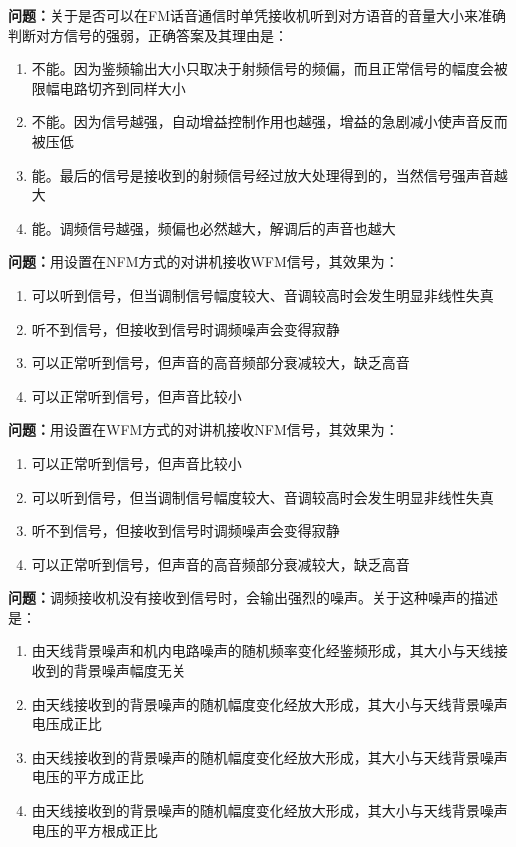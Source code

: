 \documentclass{ctexbook}%
\begin{document}
\textbf{问题：}关于是否可以在FM话音通信时单凭接收机听到对方语音的音量大小来准确判断对方信号的强弱，正确答案及其理由是：
\begin{enumerate}[label=\Alph*), leftmargin=3em]
\item 不能。因为鉴频输出大小只取决于射频信号的频偏，而且正常信号的幅度会被限幅电路切齐到同样大小
\item 不能。因为信号越强，自动增益控制作用也越强，增益的急剧减小使声音反而被压低
\item 能。最后的信号是接收到的射频信号经过放大处理得到的，当然信号强声音越大
\item 能。调频信号越强，频偏也必然越大，解调后的声音也越大
\end{enumerate}

\textbf{问题：}用设置在NFM方式的对讲机接收WFM信号，其效果为：
\begin{enumerate}[label=\Alph*), leftmargin=3em]
\item 可以听到信号，但当调制信号幅度较大、音调较高时会发生明显非线性失真
\item 听不到信号，但接收到信号时调频噪声会变得寂静
\item 可以正常听到信号，但声音的高音频部分衰减较大，缺乏高音
\item 可以正常听到信号，但声音比较小
\end{enumerate}

\textbf{问题：}用设置在WFM方式的对讲机接收NFM信号，其效果为：
\begin{enumerate}[label=\Alph*), leftmargin=3em]
\item 可以正常听到信号，但声音比较小
\item 可以听到信号，但当调制信号幅度较大、音调较高时会发生明显非线性失真
\item 听不到信号，但接收到信号时调频噪声会变得寂静
\item 可以正常听到信号，但声音的高音频部分衰减较大，缺乏高音
\end{enumerate}

\textbf{问题：}调频接收机没有接收到信号时，会输出强烈的噪声。关于这种噪声的描述是：
\begin{enumerate}[label=\Alph*), leftmargin=3em]
\item 由天线背景噪声和机内电路噪声的随机频率变化经鉴频形成，其大小与天线接收到的背景噪声幅度无关
\item 由天线接收到的背景噪声的随机幅度变化经放大形成，其大小与天线背景噪声电压成正比
\item 由天线接收到的背景噪声的随机幅度变化经放大形成，其大小与天线背景噪声电压的平方成正比
\item 由天线接收到的背景噪声的随机幅度变化经放大形成，其大小与天线背景噪声电压的平方根成正比
\end{enumerate}
\end{document}
